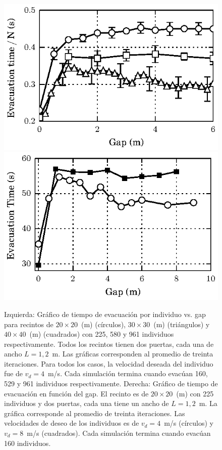\begin{figure}[H]
    \centering
    \includegraphics[scale=1]{figuras/fig1_version0.eps}
    \hfill
    \includegraphics[scale=1]{figuras/gap_vste_225_v4_v8.eps}
    \caption[width=5cm]{Izquierda: Gráfico de tiempo de evacuación por individuo vs. gap para recintos de $20\times 20$~(m) (círculos), $30\times 30$~(m) (triángulos) y $40\times 40$~(m) (cuadrados) con 225, 580 y 961 individuos respectivamente. Todos los recintos tienen dos puertas, cada una de ancho $L=1,2$~m. Las gráficas corresponden al promedio de treinta iteraciones. Para todos los casos, la velocidad deseada del individuo fue de $v_d=4$~m/s. Cada simulación termina cuando evacúan 160, 529 y 961 individuos respectivamente.
    Derecha: Gráfico de tiempo de evacuación en función del gap. El recinto es de $20\times 20$~(m) con 225 individuos y dos puertas, cada una tiene un ancho de $L=1,2$~m. La gráfica corresponde al promedio de treinta iteraciones. Las velocidades de deseo de los individuos es de $v_d=4$~m/s (círculos) y $v_d=8$~m/s (cuadrados). Cada simulación termina cuando evacúan 160 individuos.}
    \label{gap_vste_vel_n}
\end{figure}


